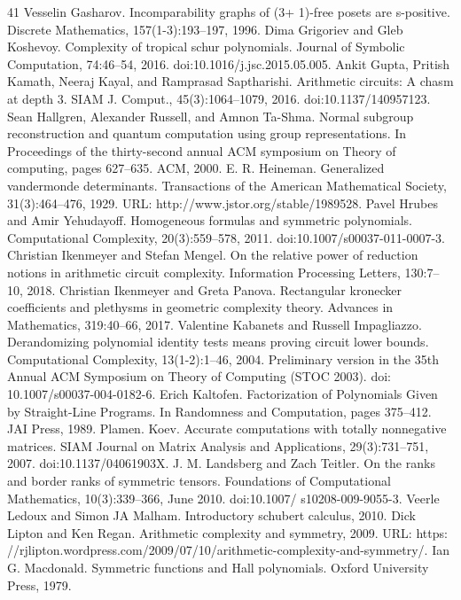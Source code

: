 \begin{thebibliography}{41}
 Vesselin Gasharov. Incomparability graphs of (3+ 1)-free posets are s-positive. Discrete Mathematics, 157(1-3):193–197, 1996.
 Dima Grigoriev and Gleb Koshevoy. Complexity of tropical schur polynomials. Journal of Symbolic Computation, 74:46–54, 2016. doi:10.1016/j.jsc.2015.05.005.
 Ankit Gupta, Pritish Kamath, Neeraj Kayal, and Ramprasad Saptharishi. Arithmetic circuits: A chasm at depth 3. SIAM J. Comput., 45(3):1064–1079, 2016. doi:10.1137/140957123.
 Sean Hallgren, Alexander Russell, and Amnon Ta-Shma. Normal subgroup reconstruction and quantum computation using group representations. In Proceedings of the thirty-second annual ACM symposium on Theory of computing, pages 627–635. ACM, 2000.
 E. R. Heineman. Generalized vandermonde determinants. Transactions of the American Mathematical Society, 31(3):464–476, 1929. URL: http://www.jstor.org/stable/1989528.
 Pavel Hrubes and Amir Yehudayoff. Homogeneous formulas and symmetric polynomials. Computational Complexity, 20(3):559–578, 2011. doi:10.1007/s00037-011-0007-3.
 Christian Ikenmeyer and Stefan Mengel. On the relative power of reduction notions in arithmetic circuit complexity. Information Processing Letters, 130:7–10, 2018.
 Christian Ikenmeyer and Greta Panova. Rectangular kronecker coefficients and plethysms in geometric complexity theory. Advances in Mathematics, 319:40–66, 2017.
 Valentine Kabanets and Russell Impagliazzo. Derandomizing polynomial identity tests means proving circuit lower bounds. Computational Complexity, 13(1-2):1–46, 2004. Preliminary version in the 35th Annual ACM Symposium on Theory of Computing (STOC 2003). doi: 10.1007/s00037-004-0182-6.
 Erich Kaltofen. Factorization of Polynomials Given by Straight-Line Programs. In Randomness and Computation, pages 375–412. JAI Press, 1989.
 Plamen. Koev. Accurate computations with totally nonnegative matrices. SIAM Journal on Matrix Analysis and Applications, 29(3):731–751, 2007. doi:10.1137/04061903X.
 J. M. Landsberg and Zach Teitler. On the ranks and border ranks of symmetric tensors. Foundations of Computational Mathematics, 10(3):339–366, June 2010. doi:10.1007/ s10208-009-9055-3.
 Veerle Ledoux and Simon JA Malham. Introductory schubert calculus, 2010.
 Dick Lipton and Ken Regan. Arithmetic complexity and symmetry, 2009. URL: https: //rjlipton.wordpress.com/2009/07/10/arithmetic-complexity-and-symmetry/.
 Ian G. Macdonald. Symmetric functions and Hall polynomials. Oxford University Press, 1979.

\end{thebibliography}
